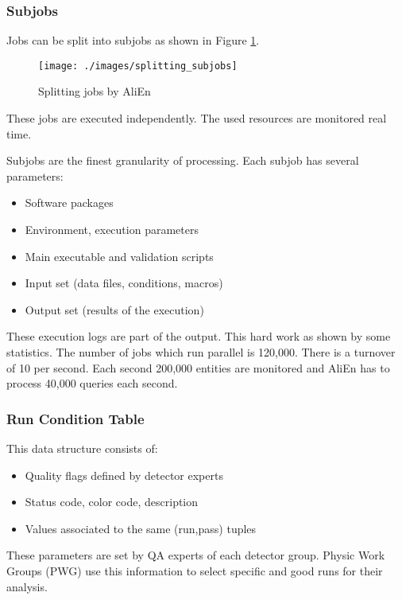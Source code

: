 \subsubsection{Subjobs}
Jobs can be split into subjobs as shown in Figure \ref{fig:splitting_subjobs}.

\begin{figure}[h]
  \begin{center}
    \texttt{[image: ./images/splitting\_subjobs]}
    \caption{Splitting jobs by AliEn}
    \label{fig:splitting_subjobs}
  \end{center}
\end{figure}

These jobs are executed independently. The used resources are monitored real time.

Subjobs are the finest granularity of processing. Each subjob has several parameters:
\begin{itemize}
  \item Software packages
  \item Environment, execution parameters
  \item Main executable and validation scripts
  \item Input set (data files, conditions, macros)
  \item Output set (results of the execution)
\end{itemize}
These execution logs are part of the output. This hard work as shown by some statistics. The number of jobs which run parallel  is 120,000. There is a turnover of 10 per second. Each second 200,000 entities are monitored and AliEn has to process 40,000 queries each second.

\subsubsection{Run Condition Table}
This data structure consists of:
\begin{itemize}
  \item Quality flags defined by detector experts
  \item Status code, color code, description
  \item Values associated to the same (run,pass) tuples
\end{itemize}
These parameters are set by QA experts of each detector group. Physic Work Groups (PWG) use this information to select specific and good runs for their analysis.

